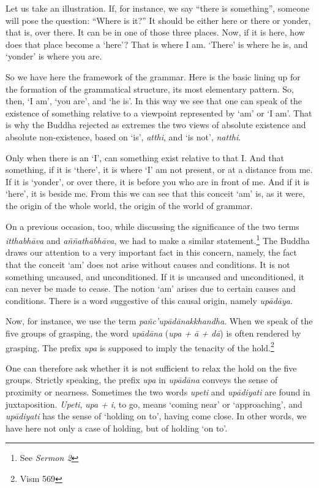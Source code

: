 Let us take an illustration. If, for instance, we say ``there is something'', someone will pose the question: ``Where is it?'' It should be either here or there or yonder, that is, over there. It can be in one of those three places. Now, if it is here, how does that place become a `here'? That is where I am. `There' is where he is, and `yonder' is where you are.

So we have here the framework of the grammar. Here is the basic lining up for the formation of the grammatical structure, its most elementary pattern. So, then, `I am', `you are', and `he is'. In this way we see that one can speak of the existence of something relative to a viewpoint represented by `am' or `I am'. That is why the Buddha rejected as extremes the two views of absolute existence and absolute non-existence, based on `is', \emph{atthi}, and `is not', \emph{natthi}.

Only when there is an `I', can something exist relative to that I. And that something, if it is `there', it is where `I' am not present, or at a distance from me. If it is `yonder', or over there, it is before you who are in front of me. And if it is `here', it is beside me. From this we can see that this conceit `am' is, as it were, the origin of the whole world, the origin of the world of grammar.

On a previous occasion, too, while discussing the significance of the two terms \emph{itthabhāva} and \emph{aññathābhāva}, we had to make a similar statement.\footnote{See \emph{Sermon 2}} The Buddha draws our attention to a very important fact in this concern, namely, the fact that the conceit `am' does not arise without causes and conditions. It is not something uncaused, and unconditioned. If it is uncaused and unconditioned, it can never be made to cease. The notion `am' arises due to certain causes and conditions. There is a word suggestive of this causal origin, namely \emph{upādāya}.

Now, for instance, we use the term \emph{pañc'upādānakkhandha}. When we speak of the five groups of grasping, the word \emph{upādāna} (\emph{upa + ā + dā}) is often rendered by grasping. The prefix \emph{upa} is supposed to imply the tenacity of the hold.\footnote{Vism 569}

One can therefore ask whether it is not sufficient to relax the hold on the five groups. Strictly speaking, the prefix \emph{upa} in \emph{upādāna} conveys the sense of proximity or nearness. Sometimes the two words \emph{upeti} and \emph{upādiyati} are found in juxtaposition. \emph{Upeti}, \emph{upa + i}, to go, means `coming near' or `approaching', and \emph{upādiyati} has the sense of `holding on to', having come close. In other words, we have here not only a case of holding, but of holding `on to'.

